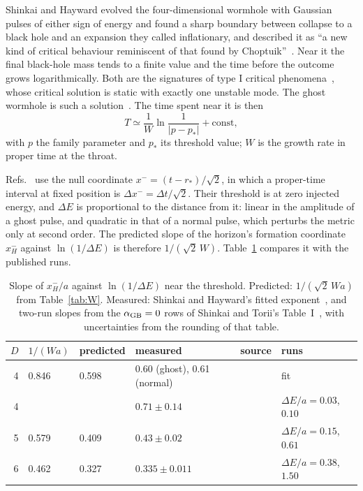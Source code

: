 \documentclass[11pt]{article}
\theoremstyle{remark}
\begin{document}
Shinkai and Hayward evolved the four-dimensional wormhole with Gaussian pulses of either sign of energy and found a
sharp boundary between collapse to a black hole and an expansion they called inflationary, and described it as ``a new kind of critical
behaviour reminiscent of that found by Choptuik''~\cite{SH2002}. Near it the final black-hole mass tends to a finite
value and the time before the outcome grows logarithmically. Both are the signatures of type I critical
phenomena~\cite{GMG2007}, whose critical solution is static with exactly one unstable mode. The ghost wormhole is such a
solution~\cite{GGS2009a,TS2013}. The time spent near it is then
\begin{equation}
T\simeq\frac{1}{W}\ln\frac{1}{|p-p_*|}+\text{const},\label{eq:lifetime}
\end{equation}
with $p$ the family parameter and $p_*$ its threshold value; $W$ is the growth rate in proper time at the throat.

Refs.~\cite{SH2002,ST2017} use the null coordinate $x^-=(t-r_*)/\sqrt2$, in which a proper-time interval at fixed
position is $\Delta x^-=\Delta t/\sqrt2$. Their threshold is at zero injected energy, and $\Delta E$ is proportional to
the distance from it: linear in the amplitude of a ghost pulse, and quadratic in that of a normal pulse, which perturbs
the metric only at second order. The predicted slope of
the horizon's formation coordinate $x^-_H$ against $\ln(1/\Delta E)$ is therefore $1/(\sqrt2\,W)$. Table~\ref{tab:life}
compares it with the published runs.

\begin{table}[t]
\centering
\caption{Slope of $x^-_H/a$ against $\ln(1/\Delta E)$ near the threshold. Predicted: $1/(\sqrt2\,Wa)$ from
Table~\ref{tab:W}. Measured: Shinkai and Hayward's fitted exponent~\cite{SH2002}, and two-run slopes from the
$\alpha_{\rm GB}=0$ rows of Shinkai and Torii's Table~I~\cite{ST2017}, with uncertainties from the rounding of that
table.}
\label{tab:life}
\begin{tabular}{rlllll}
\toprule
$D$ & $1/(Wa)$ & predicted & measured & source & runs \\
\midrule
4 & 0.846 & 0.598 & 0.60 (ghost), 0.61 (normal) & \cite{SH2002} & fit \\
4 & & & $0.71\pm0.14$ & \cite{ST2017} & $\Delta E/a=0.03$, $0.10$ \\
5 & 0.579 & 0.409 & $0.43\pm0.02$ & \cite{ST2017} & $\Delta E/a=0.15$, $0.61$ \\
6 & 0.462 & 0.327 & $0.335\pm0.011$ & \cite{ST2017} & $\Delta E/a=0.38$, $1.50$ \\
\bottomrule
\end{tabular}
\end{table}
\end{document}
